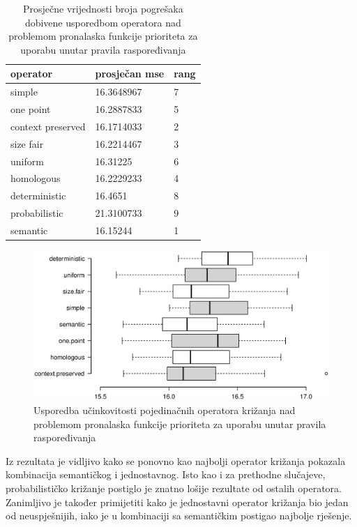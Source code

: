 \begin{table}[H]
 	\centering

    \caption{Prosječne vrijednosti broja pogrešaka dobivene usporedbom operatora nad problemom pronalaska funkcije prioriteta za uporabu unutar pravila raspoređivanja}
    \begin{tabular}{| l | l | l |}
    \hline
    \textbf{operator} & \textbf{prosječan mse} & \textbf{rang}\\ \hline
    simple & 16.3648967 & 7\\ \hline
    one point & 16.2887833 & 5\\ \hline
    context preserved & 16.1714033 & 2\\ \hline
    size fair & 16.2214467 & 3\\ \hline
    uniform & 16.31225 & 6\\ \hline
    homologous & 16.2229233 & 4\\ \hline
    deterministic & 16.4651 & 8\\ \hline
    probabilistic & 21.3100733 & 9\\ \hline
    semantic & 16.15244 & 1\\ \hline
    \end{tabular}
    
    \label{iprojekttable}
\end{table}

\begin{figure}[H]
	\centering
	\includegraphics[trim=2cm 4cm 2cm 3cm, scale=0.6]{./slike/boxPlots/iprojekt.eps}
	\caption{Usporedba učinkovitosti pojedinačnih operatora križanja nad problemom pronalaska funkcije prioriteta za uporabu unutar pravila raspoređivanja}
	\label{iprojektBox}
\end{figure}

Iz rezultata je vidljivo kako se ponovno kao najbolji operator križanja pokazala kombinacija semantičkog i jednostavnog. Isto kao i za prethodne slučajeve, probabilističko križanje postiglo je znatno lošije rezultate od ostalih operatora. Zanimljivo je također primijetiti kako je jednostavni operator križanja bio jedan od neuspješnijih, iako je u kombinaciji sa semantičkim postigao najbolje rješenje.

